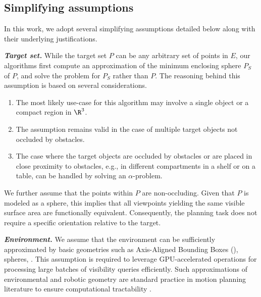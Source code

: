 \subsection{Simplifying assumptions}
In this work, we adopt several simplifying assumptions detailed below along with their underlying justifications. 


\emph{\textbf{Target set.}}
While the target set $P$ can be any arbitrary set of points in $E$, our algorithms first compute an approximation of the minimum enclosing sphere $P_S$ of $P$, and solve the \tvmp problem for $P_S$ rather than $P$. The reasoning behind this assumption is based on several considerations. 
\begin{enumerate}
    \item The most likely use-case for this algorithm may involve a single object or a compact region in $\R^3$.
    \item The assumption remains valid in the case of multiple target objects not occluded by obstacles.
    \item The case where the target objects are occluded by obstacles or are placed in close proximity to obstacles, e.g., in different compartments in a shelf or on a table, can be handled by solving an $\alpha$-\tvmp problem.
\end{enumerate}
We further assume that the points within $P$ are non-occluding. Given that $P$ is modeled as a sphere, this implies that all viewpoints yielding the same visible surface area are functionally equivalent. Consequently, the planning task does not require a specific orientation relative to the target.

\emph{\textbf{Environment.}}
We assume that the environment can be sufficiently approximated by basic geometries such as Axis-Aligned Bounding Boxes (\aabb), spheres, . This assumption is required to leverage GPU-accelerated operations for processing large batches of visibility queries efficiently. Such approximations of environmental and robotic geometry are standard practice in motion planning literature to ensure computational tractability \cite{tkk-mmvsbp-23}.

